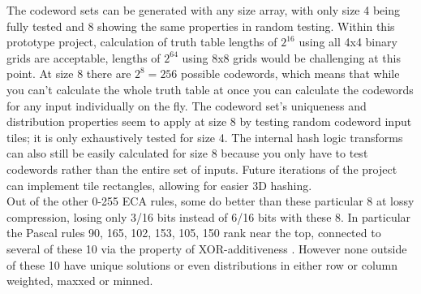 \documentclass[11pt]{article}
\begin{document}
The codeword sets can be generated with any size array, with only size 4 being fully tested and 8 showing the same properties in random testing. Within this prototype project, calculation of truth table lengths of $2^{16}$ using all 4x4 binary grids are acceptable, lengths of $2^{64}$ using 8x8 grids would be challenging at this point. At size 8 there are $2^8=256$ possible codewords, which means that while you can't calculate the whole truth table at once you can calculate the codewords for any input individually on the fly. The codeword set's uniqueness and distribution properties seem to apply at size 8 by testing random codeword input tiles; it is only exhaustively tested for size 4. The internal hash logic transforms can also still be easily calculated for size 8 because you only have to test codewords rather than the entire set of inputs. Future iterations of the project can implement tile rectangles, allowing for easier 3D hashing. \\

Out of the other 0-255 ECA rules, some do better than these particular 8 at lossy compression, losing only 3/16 bits instead of 6/16 bits with these 8. In particular the Pascal rules 90, 165, 102, 153, 105, 150 rank near the top, connected to several of these 10 via the property of XOR-additiveness \cite{xorAdditive}. However none outside of these 10 have unique solutions or even distributions in either row or column weighted, maxxed or minned.\\



\end{document}
